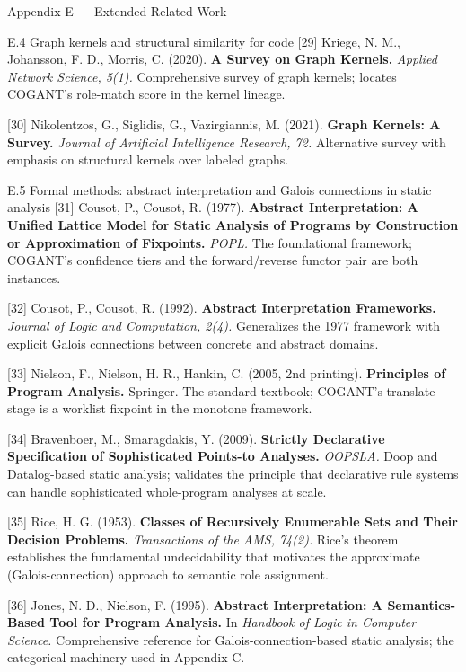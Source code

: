 \documentclass[
  ignorenonframetext,
]{beamer}
\begin{document}
\begin{frame}[fragile]{Appendix E --- Extended Related Work}
\begin{block}{E.4 Graph kernels and structural similarity for code}
{[}29{]} Kriege, N. M., Johansson, F. D., Morris, C. (2020). \textbf{A
Survey on Graph Kernels.} \emph{Applied Network Science, 5(1).}
Comprehensive survey of graph kernels; locates COGANT's role-match score
in the kernel lineage.

{[}30{]} Nikolentzos, G., Siglidis, G., Vazirgiannis, M. (2021).
\textbf{Graph Kernels: A Survey.} \emph{Journal of Artificial
Intelligence Research, 72.} Alternative survey with emphasis on
structural kernels over labeled graphs.
\end{block}

\begin{block}{E.5 Formal methods: abstract interpretation and Galois
connections in static analysis}
\protect{}\label{e.5-formal-methods-abstract-interpretation-and-galois-connections-in-static-analysis}
{[}31{]} Cousot, P., Cousot, R. (1977). \textbf{Abstract Interpretation:
A Unified Lattice Model for Static Analysis of Programs by Construction
or Approximation of Fixpoints.} \emph{POPL.} The foundational framework;
COGANT's confidence tiers and the forward/reverse functor pair are both
instances.

{[}32{]} Cousot, P., Cousot, R. (1992). \textbf{Abstract Interpretation
Frameworks.} \emph{Journal of Logic and Computation, 2(4).} Generalizes
the 1977 framework with explicit Galois connections between concrete and
abstract domains.

{[}33{]} Nielson, F., Nielson, H. R., Hankin, C. (2005, 2nd printing).
\textbf{Principles of Program Analysis.} Springer. The standard
textbook; COGANT's translate stage is a worklist fixpoint in the
monotone framework.

{[}34{]} Bravenboer, M., Smaragdakis, Y. (2009). \textbf{Strictly
Declarative Specification of Sophisticated Points-to Analyses.}
\emph{OOPSLA.} Doop and Datalog-based static analysis; validates the
principle that declarative rule systems can handle sophisticated
whole-program analyses at scale.

{[}35{]} Rice, H. G. (1953). \textbf{Classes of Recursively Enumerable
Sets and Their Decision Problems.} \emph{Transactions of the AMS,
74(2).} Rice's theorem establishes the fundamental undecidability that
motivates the approximate (Galois-connection) approach to semantic role
assignment.

{[}36{]} Jones, N. D., Nielson, F. (1995). \textbf{Abstract
Interpretation: A Semantics-Based Tool for Program Analysis.} In
\emph{Handbook of Logic in Computer Science.} Comprehensive reference
for Galois-connection-based static analysis; the categorical machinery
used in Appendix C.


\end{block}
\end{frame}
\end{document}
